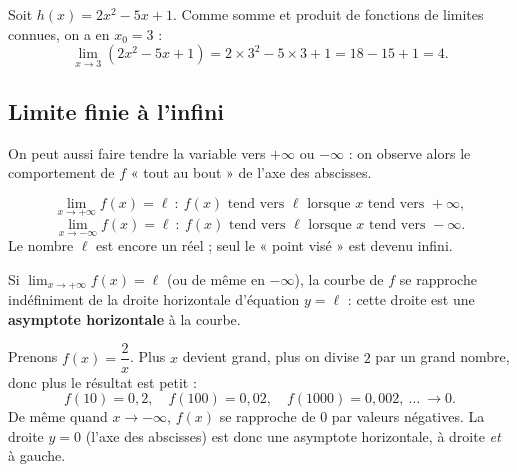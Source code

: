 \documentclass[11pt,a4paper]{article}
\begin{document}
\begin{exemple}
Soit $h(x)=2x^2-5x+1$. Comme somme et produit de fonctions de limites connues, on a en $x_0=3$ :
\[ \lim_{x\to 3}(2x^2-5x+1)=2\times 3^2-5\times 3+1=18-15+1=4. \]
\end{exemple}

\subsection{Limite finie à l'infini}

On peut aussi faire tendre la variable vers $+\infty$ ou $-\infty$ : on observe alors le
comportement de $f$ « tout au bout » de l'axe des abscisses.

\begin{definition}
\[ \lim_{x\to +\infty} f(x)=\ell\ :\ f(x)\text{ tend vers }\ell\text{ lorsque }x\text{ tend vers }+\infty, \]
\[ \lim_{x\to -\infty} f(x)=\ell\ :\ f(x)\text{ tend vers }\ell\text{ lorsque }x\text{ tend vers }-\infty. \]
Le nombre $\ell$ est encore un réel ; seul le « point visé » est devenu infini.
\end{definition}

\begin{remarque}
Si $\displaystyle\lim_{x\to+\infty} f(x)=\ell$ (ou de même en $-\infty$), la courbe de $f$ se
rapproche indéfiniment de la droite horizontale d'équation $y=\ell$ : cette droite est une
\textbf{asymptote horizontale} à la courbe.
\end{remarque}

\begin{exemple}[$\displaystyle\lim_{x\to+\infty}\frac2x=0$ et $\displaystyle\lim_{x\to-\infty}\frac2x=0$]
Prenons $f(x)=\dfrac{2}{x}$. Plus $x$ devient grand, plus on divise $2$ par un grand nombre, donc
plus le résultat est petit :
\[ f(10)=0{,}2,\quad f(100)=0{,}02,\quad f(1000)=0{,}002,\ \dots\ \longrightarrow 0. \]
De même quand $x\to-\infty$, $f(x)$ se rapproche de $0$ par valeurs négatives. La droite $y=0$
(l'axe des abscisses) est donc une asymptote horizontale, à droite \emph{et} à gauche.
\end{exemple}
\end{document}
